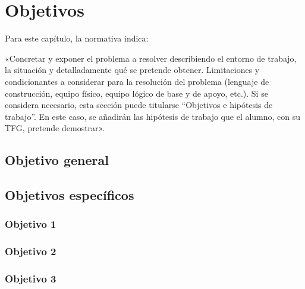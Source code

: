 \chapter{Objetivos}
\label{chap:objetivos}

\noindent
Para este capítulo, la normativa indica:

«Concretar y exponer el problema a resolver describiendo el entorno de trabajo,
la situación y detalladamente qué se pretende obtener. Limitaciones y
condicionantes a considerar para la resolución del problema (lenguaje de
construcción, equipo físico, equipo lógico de base y de apoyo, etc.). Si se
considera necesario, esta sección puede titularse ``Objetivos e hipótesis de
trabajo''. En este caso, se añadirán las hipótesis de trabajo que el alumno, con
su TFG, pretende demostrar».

\section{Objetivo general}


\section{Objetivos específicos}

\subsection{Objetivo 1}

\subsection{Objetivo 2}

\subsection{Objetivo 3}


